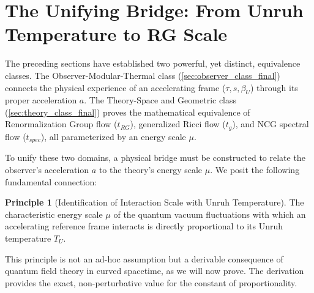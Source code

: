 \documentclass[11pt, letterpaper]{report}
\theoremstyle{plain} %
\theoremstyle{definition} %
\newtheorem{principle}{Principle}[chapter]
\theoremstyle{remark} %
\begin{document}
\section{The Unifying Bridge: From Unruh Temperature to RG Scale}
\label{sec:unifying_bridge_final}
The preceding sections have established two powerful, yet distinct, equivalence classes. The Observer-Modular-Thermal class (\cref{sec:observer_class_final}) connects the physical experience of an accelerating frame ($\tau, s, \beta_U$) through its proper acceleration $a$. The Theory-Space and Geometric class (\cref{sec:theory_class_final}) proves the mathematical equivalence of Renormalization Group flow ($t_{RG}$), generalized Ricci flow ($t_g$), and NCG spectral flow ($t_{spec}$), all parameterized by an energy scale $\mu$.

To unify these two domains, a physical bridge must be constructed to relate the observer's acceleration $a$ to the theory's energy scale $\mu$. We posit the following fundamental connection:

\begin{principle}[Identification of Interaction Scale with Unruh Temperature]
\label{principle:mu_T_proportionality_final}
The characteristic energy scale $\mu$ of the quantum vacuum fluctuations with which an accelerating reference frame interacts is directly proportional to its Unruh temperature $T_U$.
\end{principle}
\noindent This principle is not an ad-hoc assumption but a derivable consequence of quantum field theory in curved spacetime, as we will now prove. The derivation provides the exact, non-perturbative value for the constant of proportionality.
\end{document}
